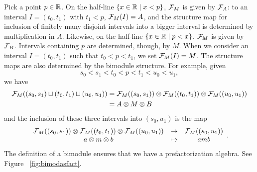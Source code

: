 \documentclass[11pt]{amsart}
\def\ot{\otimes}
\begin{document}
Pick a point $p \in \mathbb R$. On the half-line $\{x \in \mathbb R \mid x < p\}$, $\mathcal F_M$ is given by $\mathcal F_A$: to an interval $I = (t_0,t_1)$ with $t_1 <p$, $\mathcal F_M(I) = A$, and the structure map for inclusion of finitely many disjoint intervals into a bigger interval is determined by multiplication in $A$. Likewise, on the half-line $\{x \in \mathbb R \mid p < x\}$, $\mathcal F_M$ is given by $\mathcal F_B$. Intervals containing $p$ are determined, though, by $M$. When we consider an interval $I = (t_0,t_1)$ such that $t_0 < p < t_1$, we set $\mathcal F_M(I)  = M$. The structure maps are also determined by the bimodule structure. For example, given 
\[
s_0 < s_1 < t_0 < p < t_1 < u_0 < u_1,
\]
we have
\begin{align*}
\cF_M((s_0,s_1) \sqcup (t_0, t_1) \sqcup (u_0 , u_1)) 
&= \cF_M((s_0,s_1)) \ot \cF_M((t_0, t_1)) \ot \cF_M((u_0 , u_1)) \\
&= A \ot M \ot B
\end{align*}
and the inclusion of these three intervals into $(s_0,u_1)$ is the map
\[
\begin{array}{ccc}
\cF_M((s_0,s_1)) \ot \cF_M((t_0, t_1)) \ot \cF_M((u_0 , u_1)) & \to & \cF_M((s_0,u_1)) \\
a \ot m \ot b & \mapsto & amb
\end{array}.
\]
The definition of a bimodule ensures that we have a prefactorization algebra. See Figure ~\ref{fig:bimodasfact}.

\end{document}
